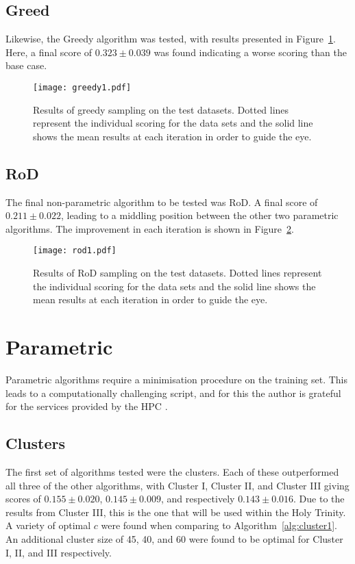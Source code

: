 \subsection{Greed}
Likewise, the Greedy algorithm was tested, with results presented in Figure~\ref{fig:GreedyTestSet}. Here, a final score of ${0.323\pm{}0.039}$ was found indicating a worse scoring than the base case.

\begin{figure}[H]
    \begin{center}
        \texttt{[image: greedy1.pdf]}
        \caption[Greedy]{Results of greedy sampling on the test datasets. Dotted lines represent the individual scoring for the data sets and the solid line shows the mean results at each iteration in order to guide the eye.}
        \label{fig:GreedyTestSet}
    \end{center}
\end{figure}

\subsection[Region of Disagreement]{RoD}
The final non-parametric algorithm to be tested was RoD. A final score of ${0.211\pm{}0.022}$, leading to a middling position between the other two parametric algorithms. The improvement in each iteration is shown in Figure~\ref{fig:RODTestSet}.

\begin{figure}[H]
    \begin{center}
        \texttt{[image: rod1.pdf]}
        \caption[RoD]{Results of RoD sampling on the test datasets. Dotted lines represent the individual scoring for the data sets and the solid line shows the mean results at each iteration in order to guide the eye.}
        \label{fig:RODTestSet}
    \end{center}
\end{figure}

\section{Parametric}
Parametric algorithms require a minimisation procedure on the training set. This leads to a computationally challenging script, and for this the author is grateful for the services provided by the HPC \cite{HPC}.

\subsection{Clusters}
The first set of algorithms tested were the clusters. Each of these outperformed all three of the other algorithms, with Cluster I, Cluster II, and Cluster III giving scores of ${0.155\pm{}0.020}$, ${0.145\pm{}0.009}$, and respectively ${0.143\pm{}0.016}$. Due to the results from Cluster III, this is the one that will be used within the Holy Trinity. A variety of optimal ${c}$ were found when comparing to Algorithm~\ref{alg:cluster1}. An additional cluster size of 45, 40, and 60 were found to be optimal for Cluster I, II, and III respectively.


